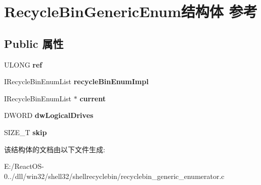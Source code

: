\hypertarget{struct_recycle_bin_generic_enum}{}\section{Recycle\+Bin\+Generic\+Enum结构体 参考}
\label{struct_recycle_bin_generic_enum}
\subsection*{Public 属性}
\begin{DoxyCompactItemize}
\item 
\mbox{\label{struct_recycle_bin_generic_enum_ae39c8f0f7aaac01467120ef258b5872d}} 
U\+L\+O\+NG {\bfseries ref}
\item 
\mbox{\label{struct_recycle_bin_generic_enum_ac92f7b897fe17b602c3c075d776195c6}} 
I\+Recycle\+Bin\+Enum\+List {\bfseries recycle\+Bin\+Enum\+Impl}
\item 
\mbox{\label{struct_recycle_bin_generic_enum_ada5214e750c6efebdc49e77bbd65ab29}} 
I\+Recycle\+Bin\+Enum\+List $\ast$ {\bfseries current}
\item 
\mbox{\label{struct_recycle_bin_generic_enum_a24a3f14979ba0be1e5764f93d2deb842}} 
D\+W\+O\+RD {\bfseries dw\+Logical\+Drives}
\item 
\mbox{\label{struct_recycle_bin_generic_enum_a1bb8667383d0bd80ab39b854021555ac}} 
S\+I\+Z\+E\+\_\+T {\bfseries skip}
\end{DoxyCompactItemize}


该结构体的文档由以下文件生成\+:\begin{DoxyCompactItemize}
\item 
E\+:/\+React\+O\+S-\/0../dll/win32/shell32/shellrecyclebin/recyclebin\+\_\+generic\+\_\+enumerator.\+c\end{DoxyCompactItemize}
